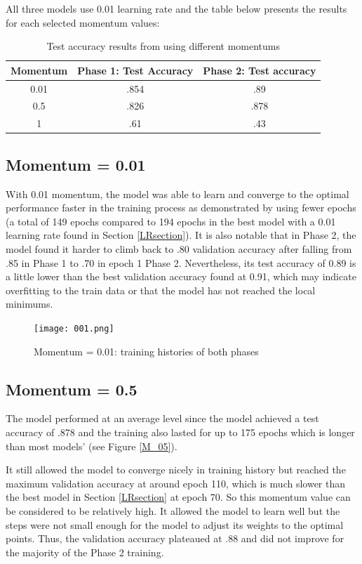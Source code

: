 \documentclass[]{article}
\begin{document}
\noindent All three models use 0.01 learning rate and the table below presents the results for each selected momentum values:
    \begin{table}[H]
    \centering
    \begin{tabular}{ | c | c | c | }
        \hline
        Momentum & Phase 1: Test Accuracy & Phase 2: Test accuracy \\ 
      \hline
        0.01 & .854 & .89 \\ 
      \hline
        0.5 & .826 & .878 \\   
      \hline
        1 & .61 & .43 \\ 
      \hline
    \end{tabular}
    \caption{Test accuracy results from using different momentums}
    \label{tab:MTestAccuracy}
    \end{table}

\subsection{Momentum = 0.01}

With 0.01 momentum, the model was able to learn and converge to the optimal performance faster in the training process as demonstrated by using fewer epochs (a total of 149 epochs compared to 194 epochs in the best model with a 0.01 learning rate found in Section \ref{LRsection}). It is also notable that in Phase 2, the model found it harder to climb back to .80 validation accuracy after falling from .85 in Phase 1 to .70 in epoch 1 Phase 2. Nevertheless, its test accuracy of 0.89 is a little lower than the best validation accuracy found at 0.91, which may indicate overfitting to the train data or that the model has not reached the local minimums. 


\begin{figure}[H]
  \texttt{[image: 001.png]}
  \centering
  \caption{Momentum = 0.01: training histories of both phases}
  \label{M_001}
\end{figure}

\subsection{Momentum = 0.5}

The model performed at an average level since the model achieved a test accuracy of .878 and the training also lasted for up to 175 epochs which is longer than most models' (see Figure \ref{M_05}). 

It still allowed the model to converge nicely in training history but reached the maximum validation accuracy at around epoch 110, which is much slower than the best model in Section \ref{LRsection} at epoch 70. So this momentum value can be considered to be relatively high. It allowed the model to learn well but the steps were not small enough for the model to adjust its weights to the optimal points. Thus, the validation accuracy plateaued at .88 and did not improve for the majority of the Phase 2 training.
\end{document}
